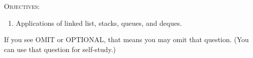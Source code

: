 \textsc{Objectives:}
\begin{enumerate}[topsep=0pt]
\item Applications of linked list, stacks, queues, and deques.
\end{enumerate}

If you see OMIT or OPTIONAL, that means you may omit that question.
(You can use that question for self-study.)

